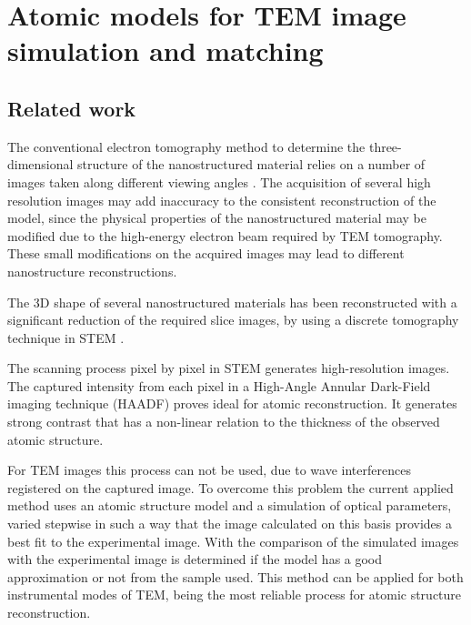 \documentclass[
  oneside,
  11pt, a4paper,
  footinclude=true,
  headinclude=true,
  cleardoublepage=empty
]{scrbook}
\begin{document}
	\chapter{Atomic models for TEM image simulation and matching}

	\section{Related work}
	
	The conventional electron tomography method to determine the three-dimensional structure of the nanostructured material relies on a number of images taken along different viewing angles \citep{batenburg20093d}. 
The acquisition of several high resolution images may add inaccuracy to the consistent reconstruction of the model, since the physical properties of the nanostructured material 
may be modified due to the high-energy electron beam required by TEM tomography. These small modifications on the acquired images may lead to different nanostructure reconstructions.\par 

The 3D shape of several nanostructured materials has been reconstructed  with a significant reduction of the required slice images, by using a discrete tomography technique in
STEM \citep{jinschek20083}.
\par 

The scanning process pixel by pixel in STEM generates high-resolution images. The captured intensity from each pixel in a High-Angle Annular Dark-Field imaging technique (HAADF) proves ideal for atomic reconstruction\citep{jia2014determination}. It generates strong contrast that has a non-linear relation to the thickness of the observed atomic structure.\par 
For TEM images this process can not be used, due to wave interferences registered on the captured image. To overcome this problem the current applied method uses an atomic structure model 
and a simulation of optical parameters,
 varied stepwise in such a way that the image calculated
on this basis provides a best fit to the experimental image. 
 With the comparison of the simulated images with the experimental image is determined if the model has a good approximation or not from the sample used. 
 This method can be applied for both instrumental modes of TEM, being the most reliable process for atomic structure reconstruction.
	
\end{document}
